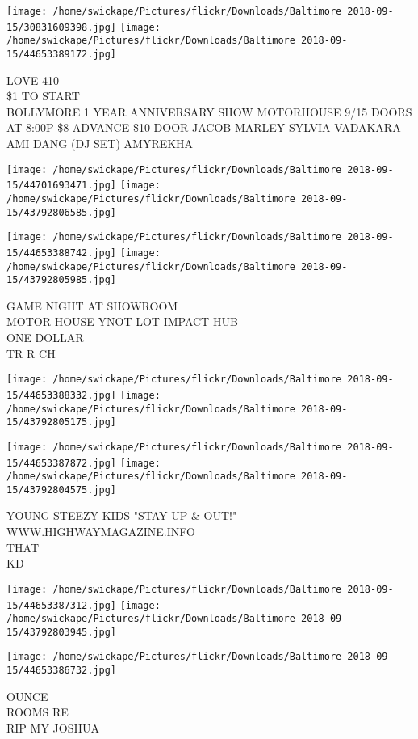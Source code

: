 \documentclass[10pt,letterpaper]{article}
\begin{document}
\vspace{0.25in}
\texttt{[image: /home/swickape/Pictures/flickr/Downloads/Baltimore 2018-09-15/30831609398.jpg]}
\texttt{[image: /home/swickape/Pictures/flickr/Downloads/Baltimore 2018-09-15/44653389172.jpg]}

LOVE 410\\
\$1 TO START\\
BOLLYMORE 1 YEAR ANNIVERSARY SHOW MOTORHOUSE 9/15 DOORS AT 8:00P \$8 ADVANCE \$10 DOOR JACOB MARLEY SYLVIA VADAKARA AMI DANG (DJ SET) AMYREKHA
\pagebreak

\texttt{[image: /home/swickape/Pictures/flickr/Downloads/Baltimore 2018-09-15/44701693471.jpg]}
\texttt{[image: /home/swickape/Pictures/flickr/Downloads/Baltimore 2018-09-15/43792806585.jpg]}

\texttt{[image: /home/swickape/Pictures/flickr/Downloads/Baltimore 2018-09-15/44653388742.jpg]}
\texttt{[image: /home/swickape/Pictures/flickr/Downloads/Baltimore 2018-09-15/43792805985.jpg]}

GAME NIGHT AT SHOWROOM\\
MOTOR HOUSE YNOT LOT IMPACT HUB\\
ONE DOLLAR\\
TR R CH
\pagebreak

\texttt{[image: /home/swickape/Pictures/flickr/Downloads/Baltimore 2018-09-15/44653388332.jpg]}
\texttt{[image: /home/swickape/Pictures/flickr/Downloads/Baltimore 2018-09-15/43792805175.jpg]}

\texttt{[image: /home/swickape/Pictures/flickr/Downloads/Baltimore 2018-09-15/44653387872.jpg]}
\texttt{[image: /home/swickape/Pictures/flickr/Downloads/Baltimore 2018-09-15/43792804575.jpg]}

YOUNG STEEZY KIDS "STAY UP \& OUT!"\\
WWW.HIGHWAYMAGAZINE.INFO\\
THAT\\
KD
\pagebreak

\texttt{[image: /home/swickape/Pictures/flickr/Downloads/Baltimore 2018-09-15/44653387312.jpg]}
\texttt{[image: /home/swickape/Pictures/flickr/Downloads/Baltimore 2018-09-15/43792803945.jpg]}

\texttt{[image: /home/swickape/Pictures/flickr/Downloads/Baltimore 2018-09-15/44653386732.jpg]}

OUNCE\\
ROOMS RE\\
RIP MY JOSHUA
\pagebreak
\end{document}
